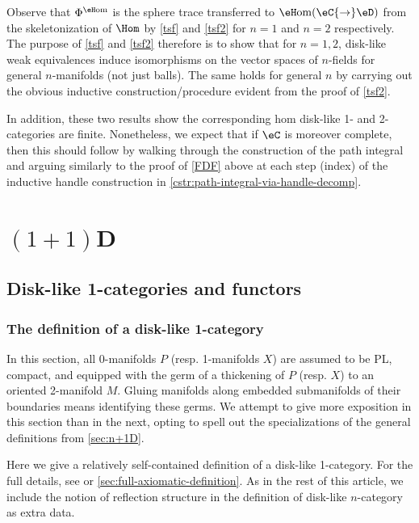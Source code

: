 \documentclass[12pt,reqno]{amsart}
\newcommand{\eHom}{{\eH}\mathrm{om}}
\newcommand{\psn}{\Phi}
\newcommand{\C}{\eC}
\newcommand{\D}{\eD}
\begin{document}
\begin{remark}
Observe that $\psn^{\eHom}$ is the sphere trace transferred to $\eHom(\C{\to}\D)$ from the skeletonization of $\Hom$ by \cref{tsf} and \cref{tsf2} for $n=1$ and $n=2$ respectively. The purpose of \cref{tsf} and \cref{tsf2} therefore is to show that for $n=1,2$, disk-like weak equivalences induce isomorphisms on the vector spaces of $n$-fields for general $n$-manifolds (not just balls). The same holds for general $n$ by carrying out the obvious inductive construction/procedure evident from the proof of \cref{tsf2}. 

In addition, these two results show the corresponding hom disk-like 1- and 2-categories are finite. Nonetheless, we expect that if $\C$ is moreover complete, then this should follow by walking through the construction of the path integral and arguing similarly to the proof of \ref{FDF} above at each step (index) of the inductive handle construction in \cref{cstr:path-integral-via-handle-decomp}. 
\end{remark}


\section{\texorpdfstring{$(1+1)$D}{(1+1)D}}
\label{sec:1+1D}

\subsection{Disk-like 1-categories and functors}

\subsubsection{The definition of a disk-like 1-category}
\label{sec:def-dl1cat}
In this section, all 0-manifolds $P$ (resp. 1-manifolds $X$) are assumed to be PL, compact, and equipped with the germ of a thickening of $P$ (resp. $X$) to an oriented 2-manifold $M$. Gluing manifolds along embedded submanifolds of their boundaries means identifying these germs. We attempt to give more exposition in this section than in the next, opting to spell out the specializations of the general definitions from \cref{sec:n+1D}.

Here we give a relatively self-contained definition of a disk-like 1-category. For the full details, see \cite[\S6.1]{MW12} or \cref{sec:full-axiomatic-definition}. As in the rest of this article, we include the notion of reflection structure in the definition of disk-like $n$-category as extra data.
\end{document}
